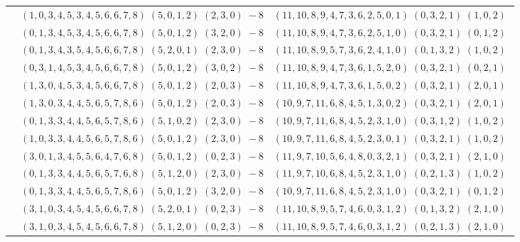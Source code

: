 \documentclass[11pt]{article}
\begin{document}
\begin{longtable}[l]{|c|c|c|}
 \cline{2-3} 
 & $(1 ,0 ,3 ,4 ,5 ,3 ,4 ,5 ,6 ,6 ,7 ,8) \;(5 ,0 ,1 ,2) \;(2 ,3 ,0) \;-8$ & $(11 ,10 ,8 ,9 ,4 ,7 ,3 ,6 ,2 ,5 ,0 ,1) \;(0 ,3 ,2 ,1) \;(1 ,0 ,2) \;$\\ 
 \cline{2-3} 
 & $(0 ,1 ,3 ,4 ,5 ,3 ,4 ,5 ,6 ,6 ,7 ,8) \;(5 ,0 ,1 ,2) \;(3 ,2 ,0) \;-8$ & $(11 ,10 ,8 ,9 ,4 ,7 ,3 ,6 ,2 ,5 ,1 ,0) \;(0 ,3 ,2 ,1) \;(0 ,1 ,2) \;$\\ 
 \cline{2-3} 
 & $(0 ,1 ,3 ,4 ,3 ,5 ,4 ,5 ,6 ,6 ,7 ,8) \;(5 ,2 ,0 ,1) \;(2 ,3 ,0) \;-8$ & $(11 ,10 ,8 ,9 ,5 ,7 ,3 ,6 ,2 ,4 ,1 ,0) \;(0 ,1 ,3 ,2) \;(1 ,0 ,2) \;$\\ 
 \cline{2-3} 
 & $(0 ,3 ,1 ,4 ,5 ,3 ,4 ,5 ,6 ,6 ,7 ,8) \;(5 ,0 ,1 ,2) \;(3 ,0 ,2) \;-8$ & $(11 ,10 ,8 ,9 ,4 ,7 ,3 ,6 ,1 ,5 ,2 ,0) \;(0 ,3 ,2 ,1) \;(0 ,2 ,1) \;$\\ 
 \cline{2-3} 
 & $(1 ,3 ,0 ,4 ,5 ,3 ,4 ,5 ,6 ,6 ,7 ,8) \;(5 ,0 ,1 ,2) \;(2 ,0 ,3) \;-8$ & $(11 ,10 ,8 ,9 ,4 ,7 ,3 ,6 ,1 ,5 ,0 ,2) \;(0 ,3 ,2 ,1) \;(2 ,0 ,1) \;$\\ 
 \cline{2-3} 
 & $(1 ,3 ,0 ,3 ,4 ,4 ,5 ,6 ,5 ,7 ,8 ,6) \;(5 ,0 ,1 ,2) \;(2 ,0 ,3) \;-8$ & $(10 ,9 ,7 ,11 ,6 ,8 ,4 ,5 ,1 ,3 ,0 ,2) \;(0 ,3 ,2 ,1) \;(2 ,0 ,1) \;$\\ 
 \cline{2-3} 
 & $(0 ,1 ,3 ,3 ,4 ,4 ,5 ,6 ,5 ,7 ,8 ,6) \;(5 ,1 ,0 ,2) \;(2 ,3 ,0) \;-8$ & $(10 ,9 ,7 ,11 ,6 ,8 ,4 ,5 ,2 ,3 ,1 ,0) \;(0 ,3 ,1 ,2) \;(1 ,0 ,2) \;$\\ 
 \cline{2-3} 
 & $(1 ,0 ,3 ,3 ,4 ,4 ,5 ,6 ,5 ,7 ,8 ,6) \;(5 ,0 ,1 ,2) \;(2 ,3 ,0) \;-8$ & $(10 ,9 ,7 ,11 ,6 ,8 ,4 ,5 ,2 ,3 ,0 ,1) \;(0 ,3 ,2 ,1) \;(1 ,0 ,2) \;$\\ 
 \cline{2-3} 
 & $(3 ,0 ,1 ,3 ,4 ,5 ,5 ,6 ,4 ,7 ,6 ,8) \;(5 ,0 ,1 ,2) \;(0 ,2 ,3) \;-8$ & $(11 ,9 ,7 ,10 ,5 ,6 ,4 ,8 ,0 ,3 ,2 ,1) \;(0 ,3 ,2 ,1) \;(2 ,1 ,0) \;$\\ 
 \cline{2-3} 
 & $(0 ,1 ,3 ,3 ,4 ,4 ,5 ,6 ,5 ,7 ,6 ,8) \;(5 ,1 ,2 ,0) \;(2 ,3 ,0) \;-8$ & $(11 ,9 ,7 ,10 ,6 ,8 ,4 ,5 ,2 ,3 ,1 ,0) \;(0 ,2 ,1 ,3) \;(1 ,0 ,2) \;$\\ 
 \cline{2-3} 
 & $(0 ,1 ,3 ,3 ,4 ,4 ,5 ,6 ,5 ,7 ,8 ,6) \;(5 ,0 ,1 ,2) \;(3 ,2 ,0) \;-8$ & $(10 ,9 ,7 ,11 ,6 ,8 ,4 ,5 ,2 ,3 ,1 ,0) \;(0 ,3 ,2 ,1) \;(0 ,1 ,2) \;$\\ 
 \cline{2-3} 
 & $(3 ,1 ,0 ,3 ,4 ,5 ,4 ,5 ,6 ,6 ,7 ,8) \;(5 ,2 ,0 ,1) \;(0 ,2 ,3) \;-8$ & $(11 ,10 ,8 ,9 ,5 ,7 ,4 ,6 ,0 ,3 ,1 ,2) \;(0 ,1 ,3 ,2) \;(2 ,1 ,0) \;$\\ 
 \cline{2-3} 
 & $(3 ,1 ,0 ,3 ,4 ,5 ,4 ,5 ,6 ,6 ,7 ,8) \;(5 ,1 ,2 ,0) \;(0 ,2 ,3) \;-8$ & $(11 ,10 ,8 ,9 ,5 ,7 ,4 ,6 ,0 ,3 ,1 ,2) \;(0 ,2 ,1 ,3) \;(2 ,1 ,0) \;$\\ 

\end{longtable}
\end{document}
